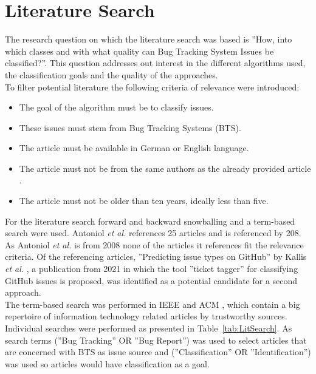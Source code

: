 \section{Literature Search}
The research question on which the literature search was based is ''How, into which classes and with what quality can Bug Tracking System Issues be classified?''. This question addresses out interest in the different algorithms used, the classification goals and the quality of the approaches.\\
To filter potential literature the following criteria of relevance were introduced:
\begin{itemize}
\item The goal of the algorithm must be to classify issues.
\item These issues must stem from Bug Tracking Systems (BTS).
\item The article must be available in German or English language.
\item The article must not be from the same authors as the already provided article \cite{Antoniol2008}.
\item The article must not be older than ten years, ideally less than five.
\end{itemize}

For the literature search forward and backward snowballing and a term-based search were used. Antoniol \textit{et al.} references 25 articles and is referenced by 208. As Antoniol \textit{et al.} is from 2008 none of the articles it references fit the relevance criteria. Of the referencing articles, ''Predicting issue types on GitHub'' by Kallis \textit{et al.} \cite{Kallis2021}, a publication from 2021 in which the tool ''ticket tagger'' for classifying GitHub issues is proposed, was identified as a potential candidate for a second approach.\\
The term-based search was performed in IEEE \cite{IEEE} and ACM \cite{ACM}, which contain a big repertoire of information technology related articles by trustworthy sources. Individual searches were performed as presented in \mbox{Table \ref{tab:LitSearch}}. As search terms (''Bug Tracking'' OR ''Bug Report'') was used to select articles that are concerned with BTS as issue source and (''Classification'' OR ''Identification'') was used so articles would have classification as a goal.\\

